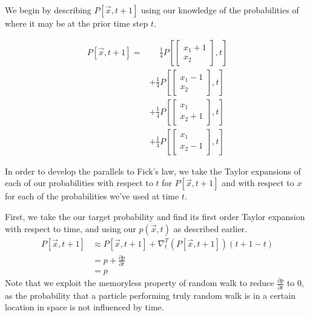 We begin by describing $P[\vec{x},t+1]$ using our knowledge of the probabilities of where it may be at the prior time step $t$.

\begin{align*}
    P\left[\vec{x}, t+1\right] =&\quad\, \frac{1}{4}P\left[\begin{bmatrix} x_1+1\\x_2 \end{bmatrix}, t\right]\\
    &+\frac{1}{4}P\left[\begin{bmatrix} x_1-1\\x_2 \end{bmatrix}, t\right]\\
    &+\frac{1}{4}P\left[\begin{bmatrix} x_1\\x_2+1 \end{bmatrix}, t\right]\\
    &+\frac{1}{4}P\left[\begin{bmatrix} x_1\\x_2-1 \end{bmatrix}, t\right]
\end{align*}

In order to develop the parallels to Fick's law, we take the Taylor expansions of each of our probabilities with respect to $t$ for $P\left[\vec{x}, t+1\right]$ and with respect to $x$ for each of the probabilities we've used at time $t$.

First, we take the our target probability and find its first order Taylor expansion with respect to time, and using our $p(\vec{x},t)$ as described earlier.
\begin{align*}
    P\left[\vec{x}, t+1\right] &\approx P\left[\vec{x}, t+1\right] + \nabla^T_t\left(P\left[\vec{x}, t+1\right]\right) (t+1-t) \\
    &= p + \frac{\partial p}{\partial t} \\
    &= p
\end{align*}
Note that we exploit the memoryless property of random walk to reduce $\frac{\partial p}{\partial t}$ to 0, as the probability that a particle performing truly random walk is in a certain location in space is not influenced by time.

